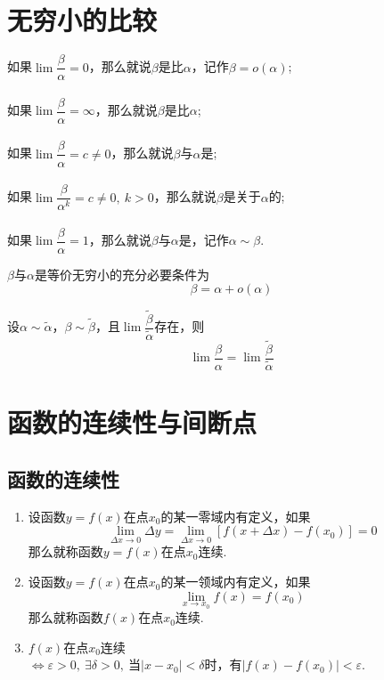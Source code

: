 \section{无穷小的比较}
\begin{definition}
	如果\( \lim \dfrac{\beta}{\alpha} = 0 \)，那么就说\( \beta \)是比\( \alpha \)，记作\( \beta = o(\alpha) \);\\\\
	如果\( \lim \dfrac{\beta}{\alpha} = \infty \)，那么就说\( \beta \)是比\( \alpha \);\\\\
	如果\( \lim \dfrac{\beta}{\alpha} = c \neq 0 \)，那么就说\( \beta \)与\( \alpha \)是;\\\\
	如果\( \lim \dfrac{\beta}{\alpha^{k}} = c \neq 0,\ k > 0 \)，那么就说\( \beta \)是关于\( \alpha \)的;\\\\
	如果\( \lim \dfrac{\beta}{\alpha} = 1 \)，那么就说\( \beta \)与\( \alpha \)是，记作\( \alpha \sim \beta \).
\end{definition}

\begin{theorem}
	\( \beta \)与\( \alpha \)是等价无穷小的{\heiti 充分必要条件}为
	\[ \beta = \alpha + o(\alpha) \]
\end{theorem}

\begin{theorem}
	设\( \alpha \sim \widetilde{\alpha} \)，\( \beta \sim \widetilde{\beta} \)，且\( \lim \dfrac{\widetilde{\beta}}{\widetilde{\alpha}} \)存在，则
	\[ \lim\dfrac{\beta}{\alpha} = \lim\dfrac{\widetilde{\beta}}{\widetilde{\alpha}} \]
\end{theorem}

\section{函数的连续性与间断点}

\subsection{函数的连续性}
\begin{definition}
	\begin{enumerate}
		\item 设函数\( y = f(x) \)在点\( x_{0} \)的某一零域内有定义，如果
		\[ \lim\limits_{\Delta x \to 0}\Delta y = \lim\limits_{\Delta x \to 0}[f(x + \Delta x) - f(x_{0})] = 0 \]
		那么就称函数\( y = f(x) \)在点\( x_{0} \)连续.
		\item 设函数\( y = f(x) \)在点\( x_{0} \)的某一领域内有定义，如果
		\[ \lim\limits_{x \to x_{0}}f(x) = f(x_{0}) \]
		那么就称函数\( f(x) \)在点\( x_{0} \)连续.
		\item \( f(x) \)在点\( x_{0} \)连续\( \Leftrightarrow \varepsilon > 0,\ \exists \delta > 0,\ \text{当}| x - x_{0}|< \delta \text{时，有}|f(x) - f(x_{0})| < \varepsilon \).
	\end{enumerate}
\end{definition}

